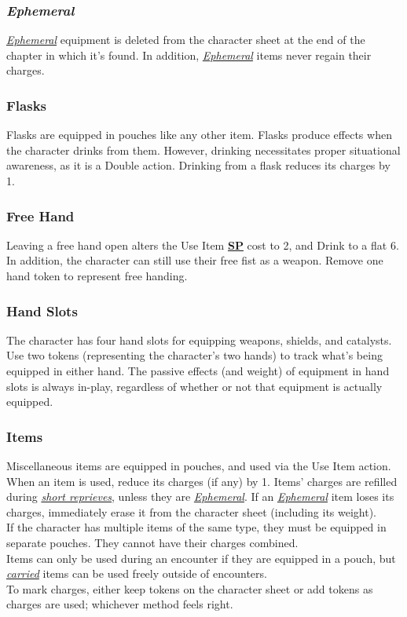 \documentclass[12pt]{article}
\newcommand{\refto}[1]{\hyperlink{#1}{\textbf{#1}}}
\newcommand{\reftoit}[1]{\hyperlink{#1}{\emph{#1}}}
\begin{document}
\begin{multicols*}{2}
\subsubsection{\emph{Ephemeral}}
\hypertarget{Ephemeral}{}
\reftoit{Ephemeral} equipment is deleted from the character sheet at the end of the chapter in which it’s found. In addition, \reftoit{Ephemeral} items never regain their charges.

\subsubsection{Flasks}
Flasks are equipped in pouches like any other item. Flasks produce effects when the character drinks from them. However, drinking necessitates proper situational awareness, as it is a Double action. Drinking from a flask reduces its charges by 1.

\subsubsection{Free Hand}
Leaving a free hand open alters the Use Item \refto{SP} cost to 2, and Drink to a flat 6. In addition, the character can still use their free fist as a weapon. Remove one hand token to represent free handing.

\subsubsection{Hand Slots}
The character has four hand slots for equipping weapons, shields, and catalysts. Use two tokens (representing the character’s two hands) to track what’s being equipped in either hand. The passive effects (and weight) of equipment in hand slots is always in-play, regardless of whether or not that equipment is actually equipped.

\subsubsection{Items}
Miscellaneous items are equipped in pouches, and used via the Use Item action. When an item is used, reduce its charges (if any) by 1. Items’ charges are refilled during \reftoit{short reprieves}, unless they are \reftoit{Ephemeral}. If an \reftoit{Ephemeral} item loses its charges, immediately erase it from the character sheet (including its weight).\\
If the character has multiple items of the same type, they must be equipped in separate pouches. They cannot have their charges combined.\\
Items can only be used during an encounter if they are equipped in a pouch, but \reftoit{carried} items can be used freely outside of encounters.\\
To mark charges, either keep tokens on the character sheet or add tokens as charges are used; whichever method feels right.


\end{multicols*}
\end{document}
